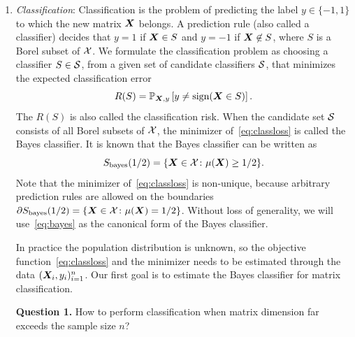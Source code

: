 \documentclass[11pt]{article}
\theoremstyle{plain}
\theoremstyle{definition}
\def\sign{\textup{sign}}
\def\bayesS{S_{\textup{bayes}}}
\begin{document}
\begin{enumerate}[label={2.\arabic*},wide, labelwidth=!, labelindent=0pt]
\item {\it Classification}: Classification is the problem of predicting the label $y\in \{-1,1\}$ to which the new matrix $\bm X$ belongs. A prediction rule (also called a classifier) decides that $y=1$ if $\bm X\in S$ and $y=-1$ if $\bm X \not\in S$, where $S$ is a Borel subset of $\mathcal{X}$. We formulate the classification problem as choosing a classifier $S\in \mathcal{S}$, from a given set of candidate classifiers $\mathcal{S}$, that minimizes the expected classification error 
\begin{equation}\label{eq:classloss}
R(S)=\mathbb{P}_{\mX,y}\left[y\neq \sign(\mX\in S)\right].
\end{equation}
The $R(S)$ is also called the classification risk. When the candidate set $\mathcal{S}$ consists of all Borel subsets of $\mathcal{X}$, the minimizer of~\eqref{eq:classloss} is called the Bayes classifier. It is known that the Bayes classifier can be written as 
\begin{equation}\label{eq:bayes}
\bayesS(1/2)=\{\mX\in \tX \colon \mu(\mX)\geq 1/2\}.
\end{equation}
Note that the minimizer of~\eqref{eq:classloss} is non-unique, because arbitrary prediction rules are allowed on the boundaries $\partial S_{\text{bayes}}(1/2) = \{\bm X\in \mathcal{X}\colon \mu(\bm X)=1/2\}$. Without loss of generality, we will use~\eqref{eq:bayes} as the canonical form of the Bayes classifier. 

In practice the population distribution is unknown, so the objective function~\eqref{eq:classloss} and the minimizer needs to be estimated through the data $(\bm X_i,y_i)_{i=1}^n$. Our first goal is to estimate the Bayes classifier for matrix classification. 

{\bf Question 1.} How to perform classification when matrix dimension far exceeds the sample size $n$?


\end{enumerate}
\end{document}
